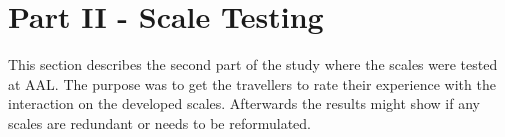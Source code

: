 \section{Part II - Scale Testing}
\label{MethodScaleTesting}
This section describes the second part of the study where the scales were tested at AAL. The purpose was to get the travellers to rate their experience with the interaction on the developed scales. Afterwards the results might show if any scales are redundant or needs to be reformulated.
%




